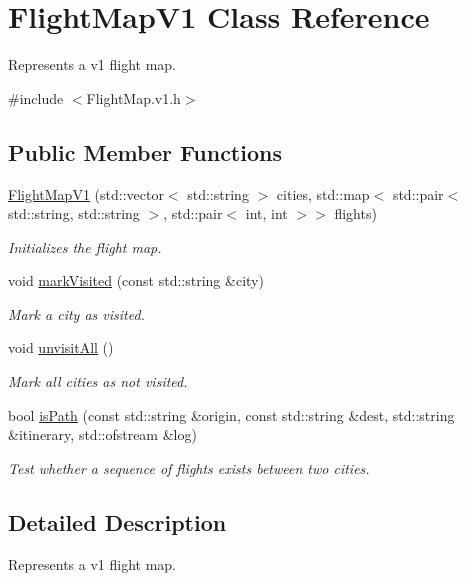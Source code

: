\hypertarget{class_flight_map_v1}{}\section{Flight\+Map\+V1 Class Reference}
\label{class_flight_map_v1}


Represents a v1 flight map.  




{\ttfamily \#include $<$Flight\+Map.\+v1.\+h$>$}

\subsection*{Public Member Functions}
\begin{DoxyCompactItemize}
\item 
\hyperlink{class_flight_map_v1_a63b4aa091dc75bc5da768489b038d6ec}{Flight\+Map\+V1} (std\+::vector$<$ std\+::string $>$ cities, std\+::map$<$ std\+::pair$<$ std\+::string, std\+::string $>$, std\+::pair$<$ int, int $>$$>$ flights)
\begin{DoxyCompactList}\small\item\em Initializes the flight map. \end{DoxyCompactList}\item 
void \hyperlink{class_flight_map_v1_a35ceda0b390b37c1153356589f32ee88}{mark\+Visited} (const std\+::string \&city)
\begin{DoxyCompactList}\small\item\em Mark a city as visited. \end{DoxyCompactList}\item 
void \hyperlink{class_flight_map_v1_a8363dacd8d9afb8e1b7b27252e988004}{unvisit\+All} ()
\begin{DoxyCompactList}\small\item\em Mark all cities as not visited. \end{DoxyCompactList}\item 
bool \hyperlink{class_flight_map_v1_ad0e8cde28ec293191160c56b0ce38aef}{is\+Path} (const std\+::string \&origin, const std\+::string \&dest, std\+::string \&itinerary, std\+::ofstream \&log)
\begin{DoxyCompactList}\small\item\em Test whether a sequence of flights exists between two cities. \end{DoxyCompactList}\end{DoxyCompactItemize}


\subsection{Detailed Description}
Represents a v1 flight map. 

